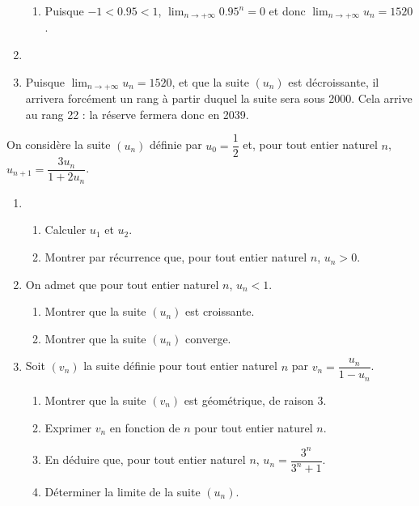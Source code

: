 \documentclass[11pt,fleqn, openany]{book} %
\begin{document}
\begin{solution}
\begin{enumerate}
\begin{enumerate}
 \item Puisque $-1<0.95<1$, $\displaystyle\lim_{n \to + \infty}0.95^n=0$ et donc $\displaystyle\lim_{n \to + \infty}u_n=1520$.\end{enumerate}
\item  



 \item Puisque $\displaystyle\lim_{n \to + \infty}u_n=1520$, et que la suite $(u_n)$ est décroissante, il arrivera forcément un rang à partir duquel la suite sera sous 2000. Cela arrive au rang 22 : la réserve fermera donc en 2039.\end{enumerate}\end{solution}
 
 
 
 

\begin{exercise}[subtitle={(Polynésie 2013)}]
On considère la suite $(u_n)$ définie par $u_0=\dfrac{1}{2}$ et, pour tout entier naturel $n$, $u_{n+1}=\dfrac{3u_n}{1+2u_n}$.

\begin{enumerate}
\item \begin{enumerate}
\item Calculer $u_1$ et $u_2$.
\item Montrer par récurrence que, pour tout entier naturel $n$, $u_n >0$.
\end{enumerate}
\item On admet que pour tout entier naturel $n$, $u_n <1$.
\begin{enumerate}
\item Montrer que la suite $(u_n)$ est croissante.
\item Montrer que la suite $(u_n)$ converge.
\end{enumerate}
\item Soit $(v_n)$ la suite définie pour tout entier naturel $n$ par $v_n=\dfrac{u_n}{1-u_n}$.
\begin{enumerate}
\item Montrer que la suite $(v_n)$ est géométrique, de raison 3.
\item Exprimer $v_n$ en fonction de $n$ pour tout entier naturel $n$.
\item En déduire que, pour tout entier naturel $n$, $u_n=\dfrac{3^n}{3^n+1}$.
\item Déterminer la limite de la suite $(u_n)$.
\end{enumerate}
\end{enumerate}
\end{exercise}
\end{document}
